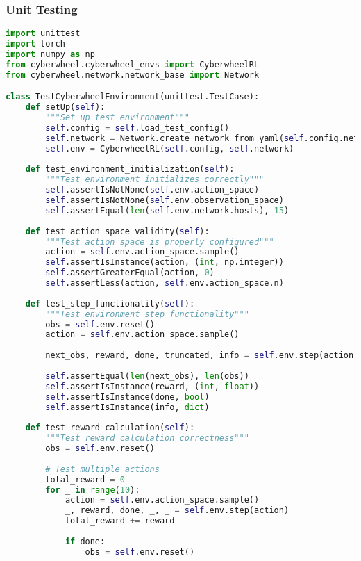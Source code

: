 \documentclass[12pt,a4paper]{article}
\begin{document}
\subsubsection{Unit Testing}
\begin{lstlisting}[language=Python, caption=Comprehensive Testing Suite]
import unittest
import torch
import numpy as np
from cyberwheel.cyberwheel_envs import CyberwheelRL
from cyberwheel.network.network_base import Network

class TestCyberwheelEnvironment(unittest.TestCase):
    def setUp(self):
        """Set up test environment"""
        self.config = self.load_test_config()
        self.network = Network.create_network_from_yaml(self.config.network_config)
        self.env = CyberwheelRL(self.config, self.network)
    
    def test_environment_initialization(self):
        """Test environment initializes correctly"""
        self.assertIsNotNone(self.env.action_space)
        self.assertIsNotNone(self.env.observation_space)
        self.assertEqual(len(self.env.network.hosts), 15)
    
    def test_action_space_validity(self):
        """Test action space is properly configured"""
        action = self.env.action_space.sample()
        self.assertIsInstance(action, (int, np.integer))
        self.assertGreaterEqual(action, 0)
        self.assertLess(action, self.env.action_space.n)
    
    def test_step_functionality(self):
        """Test environment step functionality"""
        obs = self.env.reset()
        action = self.env.action_space.sample()
        
        next_obs, reward, done, truncated, info = self.env.step(action)
        
        self.assertEqual(len(next_obs), len(obs))
        self.assertIsInstance(reward, (int, float))
        self.assertIsInstance(done, bool)
        self.assertIsInstance(info, dict)
    
    def test_reward_calculation(self):
        """Test reward calculation correctness"""
        obs = self.env.reset()
        
        # Test multiple actions
        total_reward = 0
        for _ in range(10):
            action = self.env.action_space.sample()
            _, reward, done, _, _ = self.env.step(action)
            total_reward += reward
            
            if done:
                obs = self.env.reset()
        

\end{lstlisting}
\end{document}

